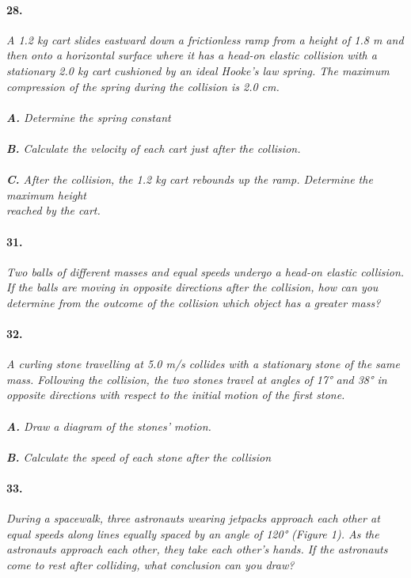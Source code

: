 \documentclass[]{article}
\begin{document}
	\paragraph{28.}
	\textit{
		A 1.2 kg cart slides eastward down a frictionless
		ramp from a height of 1.8 m and then onto a
		horizontal surface where it has a head-on elastic
		collision with a stationary 2.0 kg cart cushioned
		by an ideal Hooke’s law spring. The maximum
		compression of the spring during the collision is
		2.0 cm.
	}\\\\	
	\indent\textit{
		\textbf{A.} Determine the spring constant
	}\\\\	
	\indent\textit{
		\textbf{B.} Calculate the velocity of each cart just after the collision.
	}\\\\	
	\indent\textit{
	\textbf{C.} After the collision, the 1.2 kg cart rebounds
	up the ramp. Determine the maximum height\\
	\indent\indent reached by the cart.
	}\\	
	\par
	\paragraph{31.}
	\textit{
		Two balls of different masses and equal speeds
		undergo a head-on elastic collision. If the balls are
		moving in opposite directions after the collision,
		how can you determine from the outcome of the
		collision which object has a greater mass?
	}\\	
	\par
	\paragraph{32.}
	\textit{
		A curling stone travelling at 5.0 m/s collides
		with a stationary stone of the same mass.
		Following the collision, the two stones travel
		at angles of 17° and 38° in opposite directions
		with respect to the initial motion of the first
		stone. 
	}\\\\	
	\indent\textit{
		\textbf{A.} Draw a diagram of the stones’ motion. 
	}\\\\
	\indent\textit{
		\textbf{B.} Calculate the speed of each stone after the
		collision
	}\\
	\par
	\paragraph{33.}
	\textit{
		During a spacewalk, three astronauts wearing
		jetpacks approach each other at equal speeds along
		lines equally spaced by an angle of 120° (Figure 1).
		As the astronauts approach each other, they take each
		other’s hands. If the astronauts come to rest after
		colliding, what conclusion can you draw?
	}\\	
	\par
\end{document}
